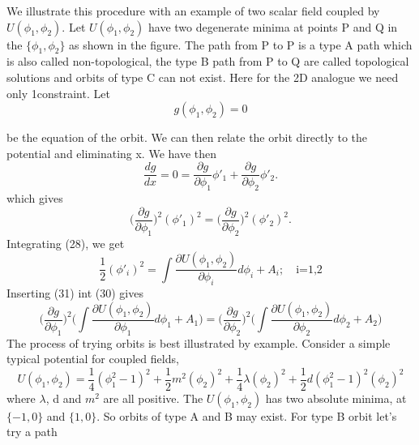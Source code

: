 \documentclass[a4paper, 12pt]{article}
\begin{document}
We illustrate this procedure with an example of two scalar field  coupled by $U(\phi_1,\phi_2)$. Let $U(\phi_1,\phi_2)$ have two degenerate minima at points P and Q in the $\{\phi_1,\phi_2\}$ as shown in the figure. The path from P to P is a type A path which is also called non-topological, the type B path from P to Q are called topological solutions and orbits of type C can not exist. Here for the 2D analogue we need only 1constraint. Let
\begin{equation}%
g(\phi_1,\phi_2) = 0
\end{equation}

be the equation of the orbit. We can then relate the orbit directly to the potential and eliminating x. We have then
$$\frac{dg}{dx} = 0 = \frac{\partial g}{\partial \phi_1} \phi '_1 + \frac{\partial g}{\partial \phi_2} \phi '_2. $$
which gives
\begin{equation}%
 \bigg(\frac{\partial g}{\partial \phi_1}\bigg)^2 (\phi '_1)^2 =  \bigg(\frac{\partial g}{\partial \phi_2}\bigg)^2 (\phi '_2)^2. 
 \end{equation}
Integrating (28), we get
\begin{equation}%
\frac{1}{2}(\phi'_i)^2 = \int \frac{\partial U(\phi_1,\phi_2)}{\partial \phi_i} d\phi_i  + A_i; \quad \textrm{i=1,2}
 \end{equation}
 Inserting (31) int (30) gives
 \begin{equation}%
 \bigg(\frac{\partial g}{\partial \phi_1}\bigg)^2 \bigg( \int \frac{\partial U(\phi_1,\phi_2)}{\partial \phi_1} d\phi_1  + A_1 \bigg) =  \bigg(\frac{\partial g}{\partial \phi_2}\bigg)^2 \bigg( \int \frac{\partial U(\phi_1,\phi_2)}{\partial \phi_2} d\phi_2  + A_2 \bigg)
 \end{equation}
The process of trying orbits is best illustrated by example. Consider a simple typical potential for coupled fields,
 \begin{equation}%
U(\phi_1,\phi_2) = \frac{1}{4}(\phi_1^2 - 1)^2  + \frac{1}{2}m^2(\phi_2)^2 + \frac{1}{4}\lambda(\phi_2)^2 + \frac{1}{2}d(\phi_1^2 - 1)^2 (\phi_2)^2
 \end{equation}
where $\lambda$, d and $m^2$ are all positive. The $U(\phi_1,\phi_2)$ has two absolute minima, at $\{-1,0\}$ and $\{1,0\}$. So orbits of type A and B may exist. For type B orbit let's try a path
\end{document}
